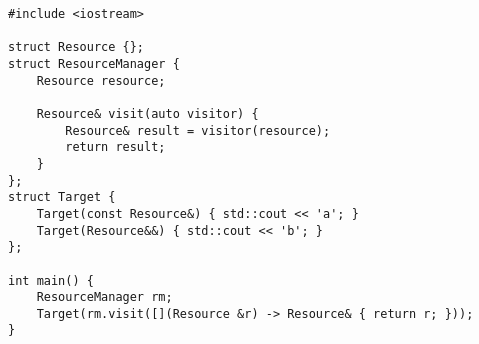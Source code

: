 \begin{lstlisting}[title=\href{https://godbolt.org/z/GfMxwk}{\texttt{godbolt.org/z/GfMxwk}}]
#include <iostream>

struct Resource {};
struct ResourceManager {
    Resource resource;

    Resource& visit(auto visitor) {
        Resource& result = visitor(resource);
        return result;
    }
};
struct Target {
    Target(const Resource&) { std::cout << 'a'; } 
    Target(Resource&&) { std::cout << 'b'; }
};

int main() {
    ResourceManager rm;
    Target(rm.visit([](Resource &r) -> Resource& { return r; }));
}
\end{lstlisting}
